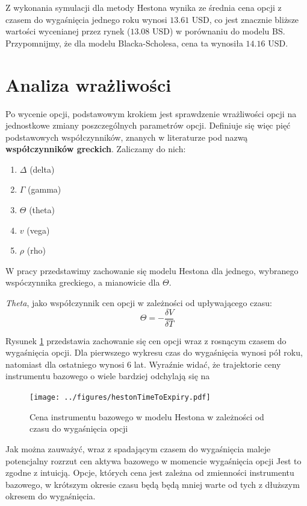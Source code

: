 \documentclass{pracamgr}
\begin{document}
Z wykonania symulacji dla metody Hestona wynika ze średnia cena opcji z czasem do wygaśnięcia jednego roku wynosi $13.61$ USD, co jest znacznie bliższe wartości wycenianej przez rynek ($13.08$ USD) w porównaniu do modelu BS. 
Przypomnijmy, że dla modelu Blacka-Scholesa, cena ta wynosiła $14.16$ USD.



\section{Analiza wrażliwości}

Po wycenie opcji, podstawowym krokiem jest sprawdzenie wrażliwości opcji na jednostkowe zmiany
poszczególnych parametrów opcji.
Definiuje się więc pięć podstawowych współczynników, znanych w literaturze pod nazwą \textbf{współczynników greckich}.
Zaliczamy do nich:
\begin{enumerate}
  \item $\Delta$ (delta)
  \item $\Gamma$ (gamma)
  \item $\Theta$ (theta)
  \item $v$ (vega)
  \item $\rho$ (rho)
\end{enumerate}

W pracy przedstawimy zachowanie się modelu Hestona dla jednego, wybranego wspóczynnika greckiego, 
a mianowicie dla $\Theta$.

\textit{Theta}, jako współczynnik cen opcji w zależności od upływającego czasu:
\begin{equation}
  \Theta = - \frac{\delta V}{\delta T}
\end{equation}

Rysunek \ref{fig:hestonTimeToExpiry} przedstawia zachowanie się cen opcji wraz z rosnącym czasem do 
wygaśnięcia opcji. Dla pierwszego wykresu czas do wygaśnięcia wynosi pół roku, natomiast dla ostatniego 
wynosi 6 lat. Wyraźnie widać, że trajektorie ceny instrumentu bazowego o wiele bardziej odchylają się 
na 
\begin{figure}
  \texttt{[image: ../figures/hestonTimeToExpiry.pdf]}
  \caption{Cena instrumentu bazowego w modelu Hestona w zależności od czasu do wygaśnięcia opcji}
  \label{fig:hestonTimeToExpiry}
\end{figure}

Jak można zauważyć, wraz z spadającym czasem do wygaśnięcia maleje potencjalny rozrzut cen aktywa bazowego w momencie wygaśnięcia opcji
Jest to zgodne z intuicją. Opcje, których cena jest zależna od zmienności instrumentu bazowego, 
w krótszym okresie czasu będą będą mniej warte od tych z dłuższym okresem do wygaśnięcia.
\end{document}
